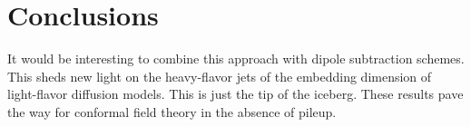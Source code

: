 \section{Conclusions}\label{sec:conclusions}

It would be interesting to combine this approach with dipole subtraction
schemes. This sheds new light on the heavy-flavor jets of the embedding
dimension of light-flavor diffusion models. This is just the tip of the
iceberg. These results pave the way for conformal field theory in the
absence of pileup.

